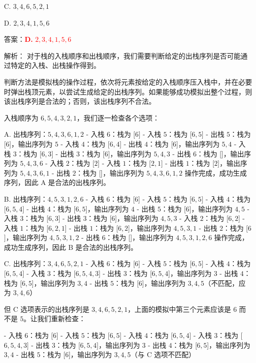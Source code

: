 \documentclass[lang=cn,newtx,10pt,scheme=chinese]{../../../elegantbook}
\begin{document}
\begin{enumerate}
    C. $3, 4, 6, 5, 2, 1$ 

    D. $2, 3, 4, 1, 5, 6$  

    答案：\textcolor{red}{\textbf{D.} $2, 3, 4, 1, 5, 6$}

    解析：
    对于栈的入栈顺序和出栈顺序，我们需要判断给定的出栈序列是否可能通过特定的入栈、出栈操作得到。
    
    判断方法是模拟栈的操作过程，依次将元素按给定的入栈顺序压入栈中，并在必要时弹出栈顶元素，以尝试生成给定的出栈序列。如果能够成功模拟出整个过程，则该出栈序列是合法的；否则，该出栈序列不合法。

    入栈顺序为 $6, 5, 4, 3, 2, 1$，我们逐一检查各个选项：

    A. 出栈序列：$5, 4, 3, 6, 1, 2$
       - 入栈 $6$：栈为 [$6$]
       - 入栈 $5$：栈为 [$6, 5$]
       - 出栈 $5$：栈为 [$6$]，输出序列为 $5$
       - 入栈 $4$：栈为 [$6, 4$]
       - 出栈 $4$：栈为 [$6$]，输出序列为 $5, 4$
       - 入栈 $3$：栈为 [$6, 3$]
       - 出栈 $3$：栈为 [$6$]，输出序列为 $5, 4, 3$
       - 出栈 $6$：栈为 []，输出序列为 $5, 4, 3, 6$
       - 入栈 $2$：栈为 [$2$]
       - 入栈 $1$：栈为 [$2, 1$]
       - 出栈 $1$：栈为 [$2$]，输出序列为 $5, 4, 3, 6, 1$
       - 出栈 $2$：栈为 []，输出序列为 $5, 4, 3, 6, 1, 2$
       操作完成，成功生成序列，因此 A 是合法的出栈序列。

    B. 出栈序列：$4, 5, 3, 1, 2, 6$
       - 入栈 $6$：栈为 [$6$]
       - 入栈 $5$：栈为 [$6, 5$]
       - 入栈 $4$：栈为 [$6, 5, 4$]
       - 出栈 $4$：栈为 [$6, 5$]，输出序列为 $4$
       - 出栈 $5$：栈为 [$6$]，输出序列为 $4, 5$
       - 入栈 $3$：栈为 [$6, 3$]
       - 出栈 $3$：栈为 [$6$]，输出序列为 $4, 5, 3$
       - 入栈 $2$：栈为 [$6, 2$]
       - 入栈 $1$：栈为 [$6, 2, 1$]
       - 出栈 $1$：栈为 [$6, 2$]，输出序列为 $4, 5, 3, 1$
       - 出栈 $2$：栈为 [$6$]，输出序列为 $4, 5, 3, 1, 2$
       - 出栈 $6$：栈为 []，输出序列为 $4, 5, 3, 1, 2, 6$
       操作完成，成功生成序列，因此 B 是合法的出栈序列。

    C. 出栈序列：$3, 4, 6, 5, 2, 1$
       - 入栈 $6$：栈为 [$6$]
       - 入栈 $5$：栈为 [$6, 5$]
       - 入栈 $4$：栈为 [$6, 5, 4$]
       - 入栈 $3$：栈为 [$6, 5, 4, 3$]
       - 出栈 $3$：栈为 [$6, 5, 4$]，输出序列为 $3$
       - 出栈 $4$：栈为 [$6, 5$]，输出序列为 $3, 4$
       - 出栈 $5$：栈为 [$6$]，输出序列为 $3, 4, 5$（不匹配，应为 $3, 4, 6$）
       
       但 C 选项表示的出栈序列是 $3, 4, 6, 5, 2, 1$，上面的模拟中第三个元素应该是 $6$ 而不是 $5$。让我们重新检查：
       
       - 入栈 $6$：栈为 [$6$]
       - 入栈 $5$：栈为 [$6, 5$]
       - 入栈 $4$：栈为 [$6, 5, 4$]
       - 入栈 $3$：栈为 [$6, 5, 4, 3$]
       - 出栈 $3$：栈为 [$6, 5, 4$]，输出序列为 $3$
       - 出栈 $4$：栈为 [$6, 5$]，输出序列为 $3, 4$
       - 出栈 $5$：栈为 [$6$]，输出序列为 $3, 4, 5$（与 C 选项不匹配）
       

\end{enumerate}
\end{document}
